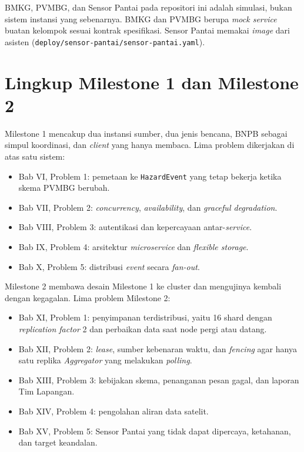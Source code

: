 BMKG, PVMBG, dan Sensor Pantai pada repositori ini adalah simulasi, bukan sistem instansi yang sebenarnya. BMKG dan PVMBG berupa \textit{mock service} buatan kelompok sesuai kontrak spesifikasi. Sensor Pantai memakai \textit{image} dari asisten (\texttt{deploy/sensor-pantai/sensor-pantai.yaml}).

\section{Lingkup Milestone 1 dan Milestone 2}

Milestone 1 mencakup dua instansi sumber, dua jenis bencana, BNPB sebagai simpul koordinasi, dan \textit{client} yang hanya membaca. Lima problem dikerjakan di atas satu sistem:

\begin{itemize}
\item Bab VI, Problem 1: pemetaan ke \texttt{HazardEvent} yang tetap bekerja ketika skema PVMBG berubah.
\item Bab VII, Problem 2: \textit{concurrency}, \textit{availability}, dan \textit{graceful degradation}.
\item Bab VIII, Problem 3: autentikasi dan kepercayaan antar-\textit{service}.
\item Bab IX, Problem 4: arsitektur \textit{microservice} dan \textit{flexible storage}.
\item Bab X, Problem 5: distribusi \textit{event} secara \textit{fan-out}.
\end{itemize}

Milestone 2 membawa desain Milestone 1 ke cluster dan mengujinya kembali dengan kegagalan. Lima problem Milestone 2:

\begin{itemize}
\item Bab XI, Problem 1: penyimpanan terdistribusi, yaitu 16 shard dengan \textit{replication factor} 2 dan perbaikan data saat node pergi atau datang.
\item Bab XII, Problem 2: \textit{lease}, sumber kebenaran waktu, dan \textit{fencing} agar hanya satu replika \textit{Aggregator} yang melakukan \textit{polling}.
\item Bab XIII, Problem 3: kebijakan skema, penanganan pesan gagal, dan laporan Tim Lapangan.
\item Bab XIV, Problem 4: pengolahan aliran data satelit.
\item Bab XV, Problem 5: Sensor Pantai yang tidak dapat dipercaya, ketahanan, dan target keandalan.
\end{itemize}

